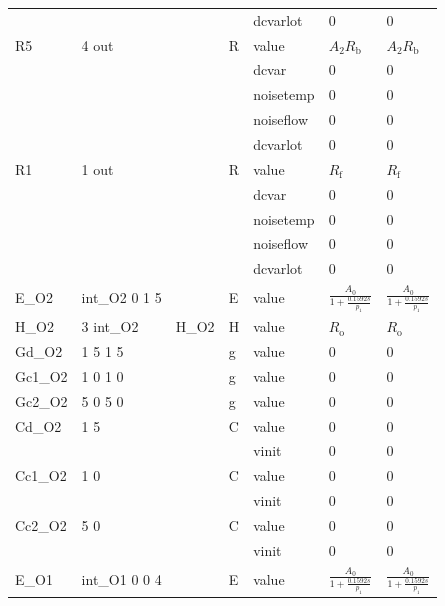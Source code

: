\begin{table}[h]
\begin{tabular}[c]{lllllll}
 & & & &\small{dcvarlot} &$0$ &$0$ \\ 
\rowcolor{myyellow}
\small{R5} &\small{4 out } & &\small{R} &\small{value} &$A_{2} R_{\mathrm{b}}$ &$A_{2} R_{\mathrm{b}}$ \\ 
 & & & &\small{dcvar} &$0$ &$0$ \\ 
\rowcolor{myyellow}
 & & & &\small{noisetemp} &$0$ &$0$ \\ 
 & & & &\small{noiseflow} &$0$ &$0$ \\ 
\rowcolor{myyellow}
 & & & &\small{dcvarlot} &$0$ &$0$ \\ 
\small{R1} &\small{1 out } & &\small{R} &\small{value} &$R_{\mathrm{f}}$ &$R_{\mathrm{f}}$ \\ 
\rowcolor{myyellow}
 & & & &\small{dcvar} &$0$ &$0$ \\ 
 & & & &\small{noisetemp} &$0$ &$0$ \\ 
\rowcolor{myyellow}
 & & & &\small{noiseflow} &$0$ &$0$ \\ 
 & & & &\small{dcvarlot} &$0$ &$0$ \\ 
\rowcolor{myyellow}
\small{E\_O2} &\small{int\_O2 0 1 5 } & &\small{E} &\small{value} &$\frac{A_{0}}{1 + \frac{0.1592 s}{p_{1}}}$ &$\frac{A_{0}}{1 + \frac{0.1592 s}{p_{1}}}$ \\ 
\small{H\_O2} &\small{3 int\_O2 } &\small{H\_O2 } &\small{H} &\small{value} &$R_{\mathrm{o}}$ &$R_{\mathrm{o}}$ \\ 
\rowcolor{myyellow}
\small{Gd\_O2} &\small{1 5 1 5 } & &\small{g} &\small{value} &$0$ &$0$ \\ 
\small{Gc1\_O2} &\small{1 0 1 0 } & &\small{g} &\small{value} &$0$ &$0$ \\ 
\rowcolor{myyellow}
\small{Gc2\_O2} &\small{5 0 5 0 } & &\small{g} &\small{value} &$0$ &$0$ \\ 
\small{Cd\_O2} &\small{1 5 } & &\small{C} &\small{value} &$0$ &$0$ \\ 
\rowcolor{myyellow}
 & & & &\small{vinit} &$0$ &$0$ \\ 
\small{Cc1\_O2} &\small{1 0 } & &\small{C} &\small{value} &$0$ &$0$ \\ 
\rowcolor{myyellow}
 & & & &\small{vinit} &$0$ &$0$ \\ 
\small{Cc2\_O2} &\small{5 0 } & &\small{C} &\small{value} &$0$ &$0$ \\ 
\rowcolor{myyellow}
 & & & &\small{vinit} &$0$ &$0$ \\ 
\small{E\_O1} &\small{int\_O1 0 0 4 } & &\small{E} &\small{value} &$\frac{A_{0}}{1 + \frac{0.1592 s}{p_{1}}}$ &$\frac{A_{0}}{1 + \frac{0.1592 s}{p_{1}}}$ \\ 

\end{tabular}
\end{table}
